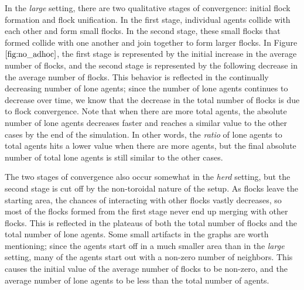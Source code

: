 In the \textit{large} setting, there are two qualitative stages of convergence:
initial flock formation and flock unification.
In the first stage, individual agents collide with each other and form small
flocks.
In the second stage, these small flocks that formed collide with one another and
join together to form larger flocks.
In Figure $\ref{fig:no_adhoc}$, the first stage is represented by the initial
increase in the average number of flocks, and the second stage is represented
by the following decrease in the average number of flocks.
This behavior is reflected in the continually decreasing number of lone agents;
since the number of lone agents continues to decrease over time, we know that the
decrease in the total number of flocks is due to flock convergence.
Note that when there are more total agents, the absolute number of lone agents
decreases faster and reaches a similar value to the other cases by the end of the
simulation.
In other words, the \textit{ratio} of lone agents to total agents hits a
lower value when there are more agents, but the final absolute number of total
lone agents is still similar to the other cases.

The two stages of convergence also occur somewhat in the \textit{herd} setting,
but the second stage is cut off by the non-toroidal nature of the setup.
As flocks leave the starting area, the chances of interacting with other flocks
vastly decreases, so most of the flocks formed from the first stage never end up
merging with other flocks.
This is reflected in the plateaus of both the total number of flocks and the total
number of lone agents.
Some small artifacts in the graphs are worth mentioning; since the agents start off
in a much smaller area than in the \textit{large} setting, many of the agents
start out with a non-zero number of neighbors.
This causes the initial value of the average number of flocks to be non-zero, and
the average number of lone agents to be less than the total number of agents.

